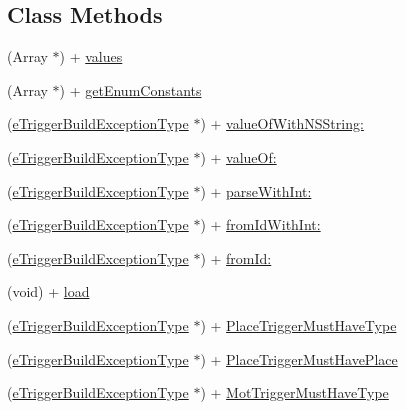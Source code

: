 \subsection*{Class Methods}
\begin{DoxyCompactItemize}
\item 
(Array $\ast$) + \hyperlink{interfacee_trigger_build_exception_type_a238dd5935219cc0039cbb9fd6e2ad616}{values}
\item 
(Array $\ast$) + \hyperlink{interfacee_trigger_build_exception_type_a6d7672cee17bcc2afe840226cbb465cc}{get\+Enum\+Constants}
\item 
(\hyperlink{interfacee_trigger_build_exception_type}{e\+Trigger\+Build\+Exception\+Type} $\ast$) + \hyperlink{interfacee_trigger_build_exception_type_aead287c39575b206d1a559cb41480a49}{value\+Of\+With\+N\+S\+String\+:}
\item 
(\hyperlink{interfacee_trigger_build_exception_type}{e\+Trigger\+Build\+Exception\+Type} $\ast$) + \hyperlink{interfacee_trigger_build_exception_type_a769f959ca7628a4fd8326c54af1bb10b}{value\+Of\+:}
\item 
(\hyperlink{interfacee_trigger_build_exception_type}{e\+Trigger\+Build\+Exception\+Type} $\ast$) + \hyperlink{interfacee_trigger_build_exception_type_a06b700425894c2bf4fce7c34ed78ac8f}{parse\+With\+Int\+:}
\item 
(\hyperlink{interfacee_trigger_build_exception_type}{e\+Trigger\+Build\+Exception\+Type} $\ast$) + \hyperlink{interfacee_trigger_build_exception_type_a3c279b64e850498f2fc378cfba4ad90a}{from\+Id\+With\+Int\+:}
\item 
(\hyperlink{interfacee_trigger_build_exception_type}{e\+Trigger\+Build\+Exception\+Type} $\ast$) + \hyperlink{interfacee_trigger_build_exception_type_a19a5bcb688bdadd5a5585ab20ee419a0}{from\+Id\+:}
\item 
(void) + \hyperlink{interfacee_trigger_build_exception_type_ae947da0875b20dc665b258d9cdb45808}{load}
\item 
(\hyperlink{interfacee_trigger_build_exception_type}{e\+Trigger\+Build\+Exception\+Type} $\ast$) + \hyperlink{interfacee_trigger_build_exception_type_ac05a864a3cf844ee43aa8d149dbb3ea7}{Place\+Trigger\+Must\+Have\+Type}
\item 
(\hyperlink{interfacee_trigger_build_exception_type}{e\+Trigger\+Build\+Exception\+Type} $\ast$) + \hyperlink{interfacee_trigger_build_exception_type_a14c45bacd4b644a7f8ab10ede037bffc}{Place\+Trigger\+Must\+Have\+Place}
\item 
(\hyperlink{interfacee_trigger_build_exception_type}{e\+Trigger\+Build\+Exception\+Type} $\ast$) + \hyperlink{interfacee_trigger_build_exception_type_aa616ab245c6e30fb323b681a76a84cc7}{Mot\+Trigger\+Must\+Have\+Type}

\end{DoxyCompactItemize}
